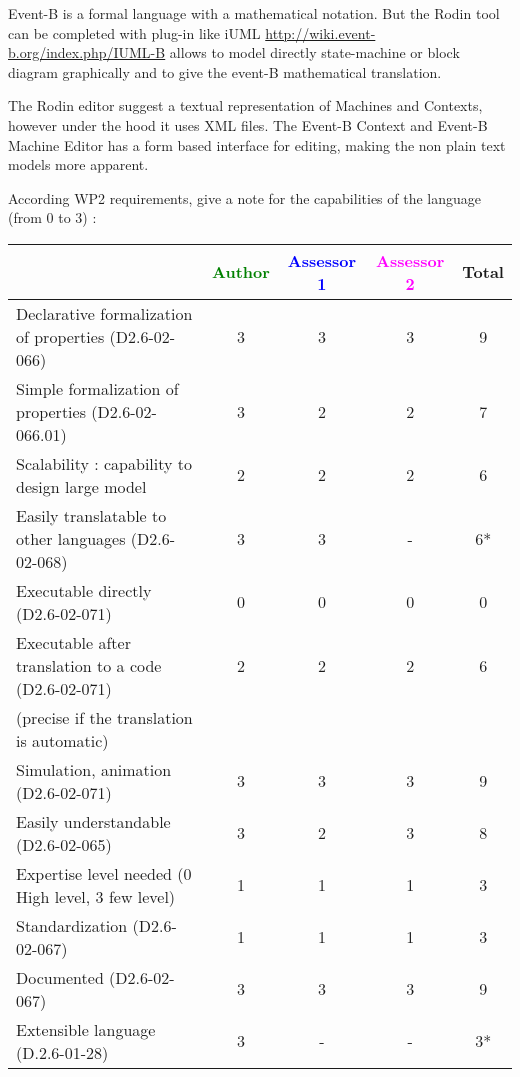 \begin{author_comment}
Event-B  is a formal language with a mathematical notation. But the Rodin tool can be completed with plug-in like iUML \url{http://wiki.event-b.org/index.php/IUML-B} allows to model directly state-machine or block diagram  graphically and to  give the event-B mathematical translation.
\end{author_comment}

\begin{assessor2}
  The Rodin editor suggest a textual representation of Machines and
  Contexts, however under the hood it uses XML files. The Event-B
  Context and Event-B Machine Editor has a form based interface for
  editing, making the non plain text models more apparent.
\end{assessor2}

According WP2 requirements, give a note for the capabilities of the language (from 0 to 3) :

\begin{tabular}{|l | c | c | c | c|}
\hline
& \textcolor{green}{Author} & \textcolor{blue}{Assessor 1} & \textcolor{magenta}{Assessor 2} & Total \\
\hline
Declarative formalization of properties (D2.6-02-066) & 3 & 3 & 3 & 9 \\
\hline
Simple formalization of properties (D2.6-02-066.01) & 3 & 2 & 2 & 7 \\
\hline
Scalability : capability to design large model & 2 & 2 & 2 & 6 \\
\hline
Easily translatable to other languages (D2.6-02-068) & 3 & 3 & - & 6* \\
\hline
Executable directly (D2.6-02-071) & 0 & 0 & 0 & 0 \\
\hline
Executable after translation to a code (D2.6-02-071) & 2 & 2 & 2 & 6 \\
(precise if the translation is automatic) & & & & \\
\hline
Simulation, animation (D2.6-02-071) & 3 & 3 & 3 & 9 \\
\hline
Easily understandable (D2.6-02-065) & 3 & 2 & 3 & 8 \\
\hline
Expertise level needed (0 High level, 3 few level) & 1 & 1 & 1 & 3 \\
\hline
Standardization (D2.6-02-067) & 1 & 1 & 1 & 3\\
\hline
Documented (D2.6-02-067) & 3 & 3 & 3 & 9\\
\hline
Extensible language (D.2.6-01-28) & 3 & - & - & 3* \\
\hline
\end{tabular}

